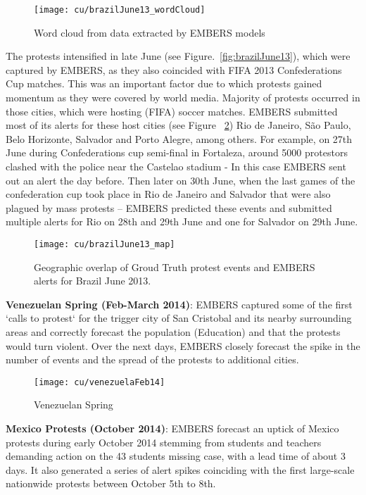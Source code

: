 \begin{figure}[H]
\centering
\texttt{[image: cu/brazilJune13\_wordCloud]}
\caption{Word cloud from data extracted by EMBERS models}
\label{fig:brazilJune13_wordCloud}
\end{figure}

The protests intensified in late June (see Figure.~\ref{fig:brazilJune13}), which were
captured by EMBERS, as they also coincided with FIFA 2013 Confederations
Cup matches. This was an important factor due to which protests gained
momentum as they were covered by world media. Majority of protests
occurred in those cities, which were hosting (FIFA) soccer matches.
EMBERS submitted most of its alerts for these host cities (see Figure
~\ref{fig:brazilJune13_map}){\textemdash} Rio de Janeiro, São Paulo,
Belo Horizonte, Salvador and Porto Alegre,
among others. For example, on 27th June during Confederations cup
semi-final in Fortaleza, around 5000 protestors clashed with the police
near the Castelao stadium - In this case EMBERS sent out an alert the
day before. Then later on 30th June, when the last games of the
confederation cup took place in Rio de Janeiro and Salvador that were
also plagued by mass protests – EMBERS predicted these events and
submitted multiple alerts for Rio on 28th and 29th June and one for
Salvador on 29th June.

\begin{figure}[H]
\texttt{[image: cu/brazilJune13\_map]}
\caption{Geographic overlap of Groud Truth protest events and EMBERS
alerts for Brazil June 2013.}
\label{fig:brazilJune13_map}
\end{figure}

\textbf{Venezuelan Spring (Feb-March 2014)}:
EMBERS captured some of the first `calls to protest` for the trigger city of
San Cristobal and its nearby surrounding areas and correctly forecast the
population (Education) and that the protests would turn violent. Over the next
days, EMBERS closely forecast the spike in the number of events and the spread
of the protests to additional cities.
   
\begin{figure}[H]
\texttt{[image: cu/venezuelaFeb14]}
\caption{Venezuelan Spring}
\label{fig:venezuelaMarch14}
\end{figure}

\textbf{Mexico Protests (October 2014)}:
EMBERS forecast an uptick of Mexico protests during early October 2014 stemming
from students and teachers demanding action on the 43 students missing
case, with a lead time of about 3
days. It also generated  a series of alert spikes coinciding with the first
large-scale nationwide protests between October 5th to 8th.

